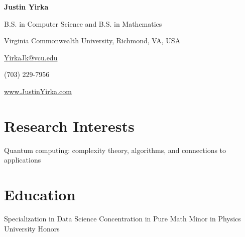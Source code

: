 \documentclass[11pt,letterpaper,serif]{moderncv}
\begin{document}
	
	
\thispagestyle{firstpage}

\begin{center}
	{\huge\textbf{Justin Yirka}}
	
	B.S. in Computer Science and B.S. in Mathematics
	
	Virginia Commonwealth University, Richmond, VA, USA
	
	\vspace{\baselineskip}
	
	\href{mailto:yirkajk@vcu.edu}{YirkaJk@vcu.edu}
	
	(703) 229-7956
	
	\url{www.JustinYirka.com}	
\end{center}


\setlength{\parskip}{0.3em}


\section{Research Interests}
Quantum computing: complexity theory, algorithms, and connections to applications


\section{Education}
\vspace{-\baselineskip}\vspace{-2\parskip}
{	
	\begin{adjustwidth}{.25in}{}
		Specialization in Data Science \newline
		Concentration in Pure Math \newline 
		Minor in Physics \newline
		University Honors
	\end{adjustwidth}
}
\end{document}
